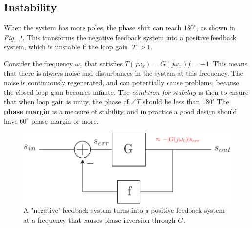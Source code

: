 \subsection{Instability}
When the system has more poles, the phase shift can reach $180^\circ$, as shown in \emph{Fig.~\ref{fig:fbblock_phase}}. 
This transforms the negative feedback system into a positive feedback system, which is unstable if the loop gain $|T|>1$.  

Consider the frequency $\omega_x$ that satisfies $ T(j\omega_x) = G(j{\omega _x})f = -1$. This means that there is always noise and disturbances in the system at this frequency.  The noise is continuously regenerated, and can potentially cause problems, because the closed loop gain becomes infinite. The \textit{condition for stability} is then to ensure that when loop gain is unity, the phase of $\angle T$ should be less than $180^\circ$  The \textbf{phase margin} is a measure of stability, and in practice a good design should have $60^\circ$ phase margin or more.
\begin{figure}[H]
\centering
\includegraphics[scale=.75]{fbblock_phase}
\caption{A "negative" feedback system turns into a positive feedback system at a frequency that causes phase inversion through $G$.}
\label{fig:fbblock_phase}
\end{figure}
%
